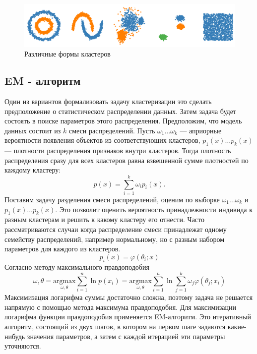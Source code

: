 \documentclass[article, 10pt]{disser}
\begin{document}
\begin{figure}[H]
\begin{center}
\includegraphics[scale = 0.3]{shape.png}
\caption{Различные формы кластеров}
\end{center}
\end{figure}

\subsection{EM - алгоритм}

Один из вариантов формализовать задачу кластеризации это сделать предположение о статистическом распределении данных. Затем задача будет состоять в поиске параметров этого распределения. Предположим, что модель данных состоит из $k$ смеси распределений. Пусть $\omega_{1}\ldots \omega_{k}$ --- априорные вероятности появления объектов из соответствующих кластеров, $p_{1}(x)\ldots p_{k}(x)$ --- плотности распределения признаков внутри кластеров. Тогда плотность распределения сразу для всех кластеров равна взвешенной сумме плотностей по каждому кластеру:
\begin{equation}
p(x) = \sum\limits_{i=1}^k \omega_{i} p_{i}(x).
\end{equation}
Поставим задачу разделения смеси распределений, оценим по выборке $\omega_{1}\ldots \omega_{k}$ и $p_{1}(x)\ldots p_{k}(x)$. Это позволит оценить вероятность принадлежности индивида к разным кластерам и решить к какому кластеру его отнести. Часто рассматриваются случаи когда распределение смеси принадлежат одному семейству распределений, например нормальному, но с разным набором параметров для каждого из кластеров. 
\begin{equation}
p_{i}(x) = \varphi(\theta_{i}; x)
\end{equation}
Согласно методу максимального правдоподобия 
\begin{equation}\label{maxlog} 
\omega, \theta = \underset{\omega, \theta}{\text{argmax}} \sum\limits_{i=1}^n \ln{p(x_{i})}  =  \underset{\omega, \theta}{\text{argmax}} \sum\limits_{i=1}^n \ln  \sum\limits_{j=1}^k \omega_{j}  \varphi(\theta_{j}; x_{i})
\end{equation}
Максимизация логарифма суммы достаточно сложна, поэтому задача не решается напрямую с помощью метода максимума правдоподобия. Для максимизации логарифма функции правдоподобия применяется EM-алгоритм. Это итеративный алгоритм, состоящий из двух шагов, в котором на первом шаге задаются какие-нибудь значения параметров, а затем с каждой итерацией эти параметры уточняются.
\end{document}
